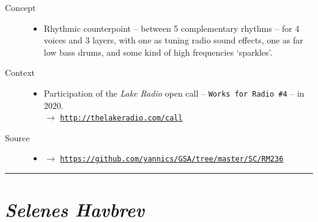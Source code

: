 \begin{description}
\item[Concept] \hfill 
\begin{itemize}
\item[] Rhythmic counterpoint -- between 5 complementary rhythms -- for 4 voices and 3 layers, with one as tuning radio sound effects, one as far low bass drums, and some kind of high frequencies `sparkles'.
\end{itemize}
\bigskip
\item[Context] \hfill 
\begin{itemize}
\item[] Participation of the \textit{Lake Radio} open call -- \texttt{Works for Radio \#4} -- in 2020. \\
$\rightarrow$ \href{http://thelakeradio.com/call}{\texttt{\small http://thelakeradio.com/call}}
\end{itemize}
\bigskip
\bigskip
\item[Source] \hfill 
\begin{itemize}
\item[] $\rightarrow$ \href{https://github.com/yannics/GSA/tree/master/SC/RM236}{\texttt{\small https://github.com/yannics/GSA/tree/master/SC/RM236}}  
\end{itemize}
\end{description}

\bigskip

\begin{center}\rule{0.5\linewidth}{0.5pt}\end{center}

\bigskip


\section*{\textsl{Selenes Havbrev}}


\bigskip

